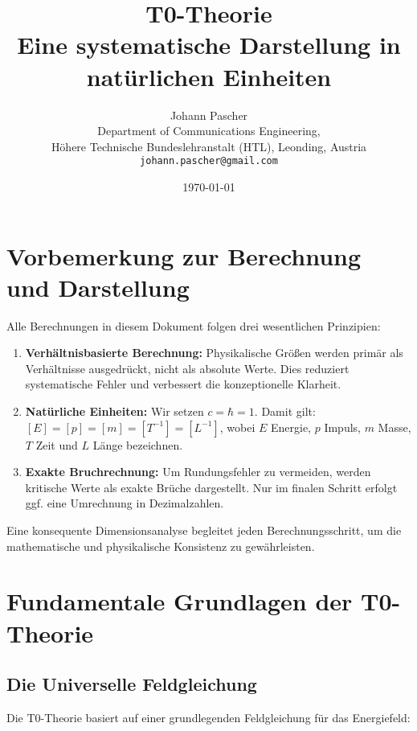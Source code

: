 \documentclass[12pt,a4paper]{article}
\title{\Huge\textbf{T0-Theorie}\\\Large Eine systematische Darstellung in natürlichen Einheiten}
\author{Johann Pascher\\
	Department of Communications Engineering, \\Höhere Technische Bundeslehranstalt (HTL), Leonding, Austria\\
	\texttt{johann.pascher@gmail.com}}
\date{\today}
\theoremstyle{definition}
\begin{document}
	
	\maketitle
	\tableofcontents
	\thispagestyle{fancy}
	\newpage
	
	\section*{Vorbemerkung zur Berechnung und Darstellung}
	
	\begin{wichtig}
		Alle Berechnungen in diesem Dokument folgen drei wesentlichen Prinzipien:
		
		\begin{enumerate}[label=\textbf{\arabic*.}]
			\item \textbf{Verhältnisbasierte Berechnung:} Physikalische Größen werden primär als Verhältnisse ausgedrückt, nicht als absolute Werte. Dies reduziert systematische Fehler und verbessert die konzeptionelle Klarheit.
			
			\item \textbf{Natürliche Einheiten:} Wir setzen $c = \hbar = 1$. Damit gilt: $[E] = [p] = [m] = [T^{-1}] = [L^{-1}]$, wobei $E$ Energie, $p$ Impuls, $m$ Masse, $T$ Zeit und $L$ Länge bezeichnen.
			
			\item \textbf{Exakte Bruchrechnung:} Um Rundungsfehler zu vermeiden, werden kritische Werte als exakte Brüche dargestellt. Nur im finalen Schritt erfolgt ggf. eine Umrechnung in Dezimalzahlen.
		\end{enumerate}
		
		Eine konsequente Dimensionsanalyse begleitet jeden Berechnungsschritt, um die mathematische und physikalische Konsistenz zu gewährleisten.
	\end{wichtig}
	
	\section{Fundamentale Grundlagen der T0-Theorie}
	
	\subsection{Die Universelle Feldgleichung}
	
	Die T0-Theorie basiert auf einer grundlegenden Feldgleichung für das Energiefeld:
	
\end{document}
